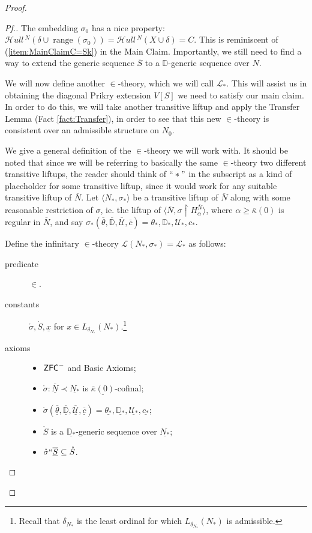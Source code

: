 \documentclass{amsart}
\theoremstyle{definition}
\theoremstyle{remark}
\newcommand{\D}{\mathbb{D}}
\newcommand{\N}{{\overline{N}}}
\renewcommand{\S}{{\overline{S}}}
\newcommand{\U}{\mathcal{U}}
\newcommand{\ZFC}{\textup{\ensuremath{\textsf{ZFC}}}}
\DeclareMathOperator{\ran}{range}
\newcommand{\rest}{\mathbin{\upharpoonright}}
\newcommand{\SH}{\mathcal{H}\textit{ull} \,}
\newcommand{\sk}[3]{\SH^{#1}( {#2} \cup {\ran(#3)} ) }
\newcommand{\Sk}[3]{\SH^{#1}( {#2} \cup {#3} ) }
\begin{document}
\begin{proof}
\begin{proof}[Pf.]
The embedding $\sigma_0$ has a nice property: $\sk{N}{\delta}{\sigma_0}=\Sk{N}{X}{\delta}= C.$ This is reminiscent of (\ref{item:MainClaimC=Sk}) in the Main Claim. 
Importantly, we still need to find a way to extend the generic sequence $\S$ to a $\D$-generic sequence over $N$. 

We will now define another $\in$-theory, which we will call $\mathcal L_*$. 
This will assist us in obtaining the diagonal Prikry extension $V[S]$ we need to satisfy our main claim. In order to do this, we will take another transitive liftup and apply the Transfer Lemma (Fact \ref{fact:Transfer}), in order to see that this new $\in$-theory is consistent over an admissible structure on $N_0$. 

We give a general definition of the $\in$-theory we will work with. It should be noted that since we will be referring to basically the same $\in$-theory two different transitive liftups, the reader should think of $``*"$ in the subscript as a kind of placeholder for some transitive liftup, since it would work for any suitable transitive liftup of $\N$.
Let $\langle N_*, \sigma_* \rangle$ be a transitive liftup of $\N$ along with some reasonable restriction of $\sigma$, ie. the liftup of $\langle \N, \sigma \rest H_{\alpha}^{\N} \rangle$, where $\alpha \geq \overline \kappa(0)$ is regular in $\N$, and say $\sigma_*(\overline \theta, \overline{\D}, \overline{\U}, \overline c) = \theta_*, \D_*, \U_*, c_*.$

Define the infinitary $\in$-theory $\mathcal L(N_*, \sigma_*)=\mathcal L_*$ as follows: 

\begin{description}
	\item[predicate] $\in$.
	\item[constants] $\mathring{\sigma}, \mathring S, \underline x$ for $x \in L_{\delta_{N_*}}(N_*)$.\footnote{Recall that $\delta_{N_*}$ is the least ordinal for which $L_{\delta_{N_*}}(N_*)$ is admissible.}
	\item[axioms] \begin{itemize} \item $\ZFC^-$ and \textsf{Basic Axioms};
		\item $\mathring \sigma : \underline \N \prec \underline{N_*}$ is $\underline{\overline \kappa(0)}$-cofinal;
		\item $\mathring{\sigma}(\overline{\underline{\theta}}, \overline{\underline{\D}}, \overline{\underline{\U}}, \overline{\underline c})=\underline{\theta_*}, \underline{\D_*}, \underline{\U_*}, \underline{c_*}$;
		\item $\mathring S$ is a $\underline{\D_*}$-generic sequence over $\underline{N_*}$;
		\item $\mathring \sigma ``\overline{\underline S} \subseteq \mathring S$.
	\end{itemize}
\end{description} 


\end{proof}
\end{proof}
\end{document}
